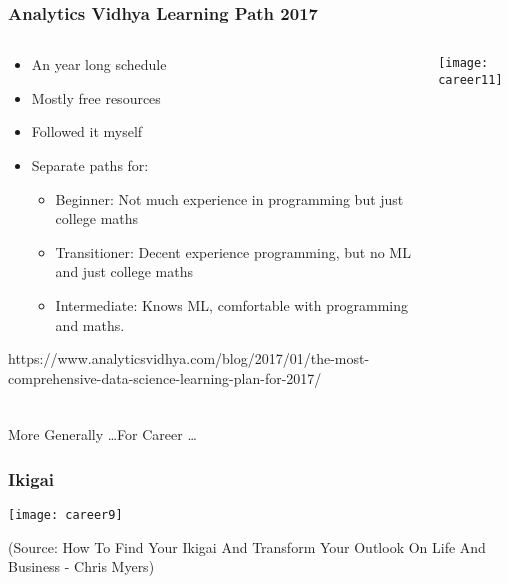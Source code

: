 \begin{frame}[fragile]\frametitle{Analytics Vidhya Learning Path 2017}
\begin{columns}
    \begin{column}[T]{0.5\linewidth}
      \begin{itemize}
			\item An year long schedule
			\item Mostly free resources
			\item Followed it myself
			\item Separate paths for:
			      \begin{itemize}

						\item Beginner: Not much experience in programming but just college maths
						\item Transitioner: Decent experience programming, but no ML and just college maths
						\item Intermediate: Knows ML, comfortable with programming and maths.
						\end{itemize}
			\end{itemize}
				https://www.analyticsvidhya.com/blog/2017/01/the-most-comprehensive-data-science-learning-plan-for-2017/

		\end{column}
    \begin{column}[T]{0.5\linewidth}
		
	\begin{center}
	\texttt{[image: career11]}
	\end{center}
    \end{column}
  \end{columns}
	

	
\end{frame}

\begin{frame}[fragile]\frametitle{}
	
	\begin{center}
	{\Large More Generally \ldots For Career \ldots}  
	\end{center}

\end{frame}


\begin{frame}[fragile]\frametitle{Ikigai}
	
	\begin{center}
	\texttt{[image: career9]}
	\end{center}
	
	{\tiny (Source:  How To Find Your Ikigai And Transform Your Outlook On Life And Business - Chris Myers)}

\end{frame}

